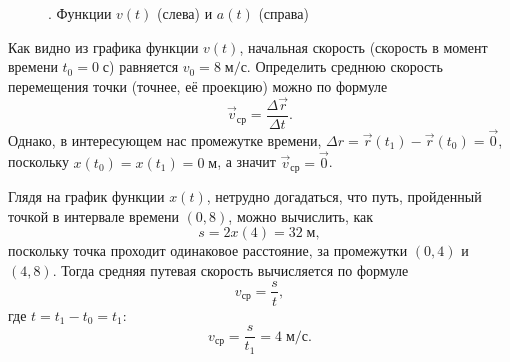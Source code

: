 \begin{figure}[h!]
	\begin{center}
		\caption{. Функции $v(t)$ (слева) и $a(t)$ (справа)}\label{pic:6.2}
	\end{center}
\end{figure}

Как видно из графика функции $v(t)$, начальная скорость (скорость в момент времени $t_0=0\;\text{с}$) равняется $v_0=8\;\text{м/с}$. Определить среднюю скорость перемещения точки (точнее, её проекцию) можно по формуле
\[
\vec v_\text{ср}=\frac{\Delta\vec r}{\Delta t}.
\]
Однако, в интересующем нас промежутке времени, $\Delta r=\vec r(t_1)-\vec r(t_0)=\vec 0$, поскольку $x(t_0)=x(t_1)=0\;\text{м}$, а значит $\vec v_\text{ср}=\vec 0$.

Глядя на график функции $x(t)$, нетрудно догадаться, что путь, пройденный точкой в интервале времени $(0,8)$, можно вычислить, как
\[
s=2x(4)=32\;\text{м},
\]
поскольку точка проходит одинаковое расстояние, за промежутки $(0,4)$ и $(4,8)$. Тогда средняя путевая скорость вычисляется по формуле
\[
v_\text{ср}=\frac{s}{t},
\]
где $t=t_1-t_0=t_1$:
\[
v_\text{ср}=\frac{s}{t_1}=4\;\text{м/с}.
\]